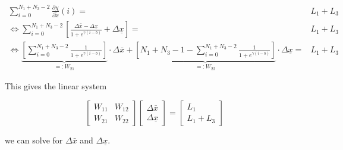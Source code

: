 \documentclass{scrartcl}[12pt, halfparskip]
\begin{document}
\begin{subequations}
	\begin{align}
	\sum_{i=0}^{N_1 + N_3 - 2} \frac{\partial \chi}{\partial \tilde{x}}(i) = & L_1 + L_3 \\
	\Leftrightarrow \sum_{i=0}^{N_1 + N_3 - 2} \left[ \frac{\Delta \bar{x} - \Delta \underline{x}}{1 + e^{\gamma(i - b)}} + \Delta \underline{x} \right] = & L_1 + L_3 \\
	\Leftrightarrow \underbrace{ \left[ \sum_{i=0}^{N_1 + N_3 - 2} \frac{1}{1 + e^{\gamma(i - b)}} \right] }_{=: W_{21}} \cdot \Delta \bar{x} + \underbrace{ \left[ N_1 + N_3 - 1 - \sum_{i=0}^{N_1 + N_3 - 2} \frac{1}{1 + e^{\gamma(i - b)}} \right] }_{=: W_{22}} \cdot \Delta \underline{x} = & L_1 + L_3
	\end{align}
\end{subequations}

This gives the linear system

\begin{equation}
	\begin{bmatrix}
		W_{11} & W_{12} \\
		W_{21} & W_{22}
	\end{bmatrix}
	\begin{bmatrix}
		\Delta \bar{x} \\
		\Delta \underline{x}
	\end{bmatrix}
	= 
	\begin{bmatrix}
		L_1 \\
		L_1 + L_3
	\end{bmatrix}
\end{equation}
  
 we can solve for $\Delta \bar{x}$ and $\Delta \underline{x}$. \\
\end{document}
